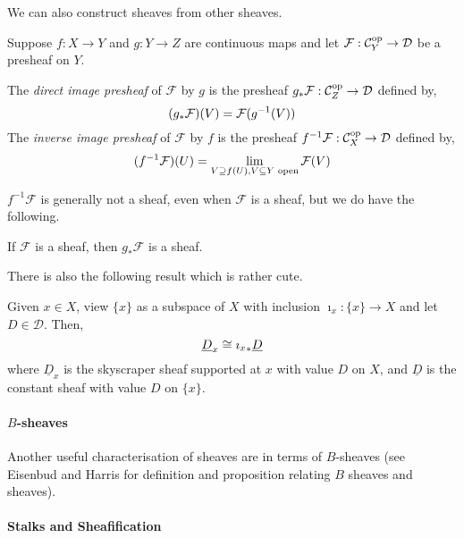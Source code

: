 \documentclass[000-main.tex]{subfiles}
\begin{document}
We can also construct sheaves from other sheaves.
\begin{definition}
  Suppose $f: X\to Y$ and $g: Y\to Z$ are continuous maps and let $\mathcal{F}: \mathcal{C}_Y^{\text{op}} \to \mathcal{D}$ be a presheaf on $Y$.

  The \emph{direct image presheaf} of $\mathcal{F}$ by $g$ is the presheaf ${{g}_{*}}\mathcal{F}: \mathcal{C}_Z^{\text{op}}\to \mathcal{D}$ defined by,
  \begin{displaymath}
    ({{g}_{*}}\mathcal{F})(V) = \mathcal{F}(g^{-1}(V))
  \end{displaymath}
  The \emph{inverse image presheaf} of $\mathcal{F}$ by $f$ is the presheaf $f^{-1}\mathcal{F}: \mathcal{C}_X^{\text{op}}\to \mathcal{D}$ defined by,
  \begin{displaymath}
    (f^{-1}\mathcal{F})(U) = \lim_{V\supseteq f(U), V\subseteq Y\text{ open}}\mathcal{F}(V)
  \end{displaymath}
\end{definition}

$f^{-1}\mathcal{F}$ is generally not a sheaf, even when $\mathcal{F}$ is a sheaf, but we do have the following.
\begin{lemma}
  If $\mathcal{F}$ is a sheaf, then $g_*\mathcal{F}$ is a sheaf.
\end{lemma}
There is also the following result which is rather cute.
\begin{lemma}
  Given $x\in X$, view $\{x\}$ as a subspace of $X$ with inclusion $\imath_x: \{x\}\to X$ and let $D\in \mathcal{D}$.
  Then,
  \begin{displaymath}
    \underline{D}_x \cong {{\imath_x}_{*}}\underline{D}
  \end{displaymath}
  where $\underline{D}_x$ is the skyscraper sheaf supported at $x$ with value $D$ on $X$, and $\underline{D}$ is the constant sheaf with value $D$ on $\{x\}$.
\end{lemma}


\paragraph{$B$-sheaves}

Another useful characterisation of sheaves are in terms of $B$-sheaves (see Eisenbud and Harris for definition and proposition relating $B$ sheaves and sheaves).

\paragraph{Stalks and Sheafification}
\end{document}
